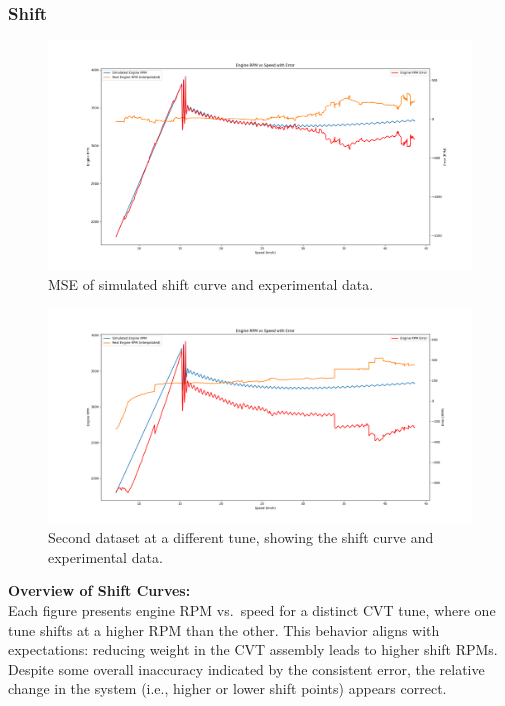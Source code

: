 \documentclass[12pt, titlepage]{article}
\begin{document}
\subsubsection{Shift}

\begin{figure}[H]
  \begin{center}
   \includegraphics[width=\textwidth]{MSE Graphs/shift_curve_3400rpm.png}
  \caption{MSE of simulated shift curve and experimental data.}
  \label{Fig_Shift_3400} 
  \end{center}
\end{figure}

\begin{figure}[H]
  \begin{center}
   \includegraphics[width=\textwidth]{MSE Graphs/shift_curve_low_ratio.png}
  \caption{Second dataset at a different tune, showing the shift curve and experimental data.}
  \label{Fig_Shift_Low_Ratio} 
  \end{center}
\end{figure}

\textbf{Overview of Shift Curves:}\\
Each figure presents engine RPM vs.\ speed for a distinct CVT tune, where one tune shifts at a higher RPM than the other. This behavior aligns with expectations: reducing weight in the CVT assembly leads to higher shift RPMs. Despite some overall inaccuracy indicated by the consistent error, the relative change in the system (i.e., higher or lower shift points) appears correct.
\end{document}
